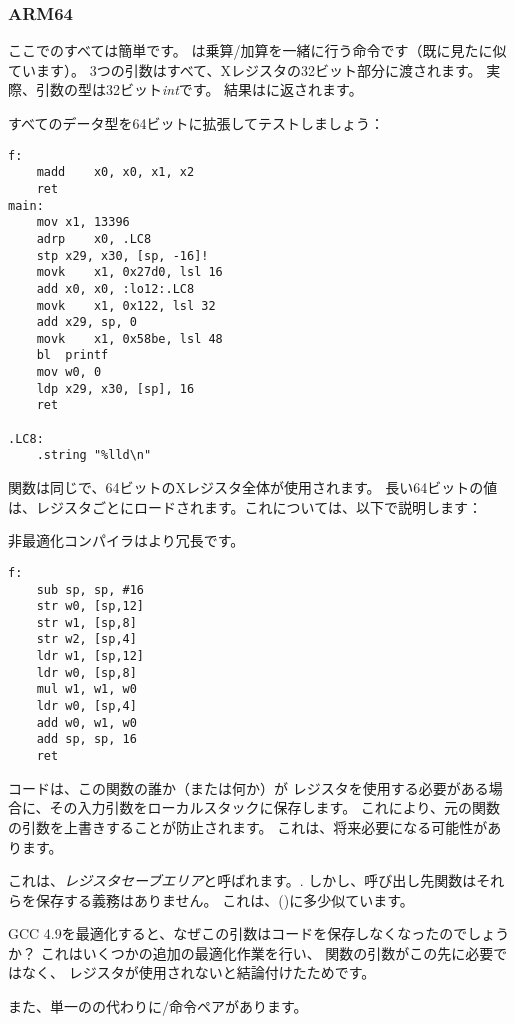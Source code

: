 \subsubsection{ARM64}


ここでのすべては簡単です。 
は乗算/加算を一緒に行う命令です（既に見たに似ています）。 
3つの引数はすべて、Xレジスタの32ビット部分に渡されます。 
実際、引数の型は32ビット\emph{int}です。 結果はに返されます。



すべてのデータ型を64ビットに拡張してテストしましょう：



\begin{lstlisting}[style=customasmARM]
f:
	madd	x0, x0, x1, x2
	ret
main:
	mov	x1, 13396
	adrp	x0, .LC8
	stp	x29, x30, [sp, -16]!
	movk	x1, 0x27d0, lsl 16
	add	x0, x0, :lo12:.LC8
	movk	x1, 0x122, lsl 32
	add	x29, sp, 0
	movk	x1, 0x58be, lsl 48
	bl	printf
	mov	w0, 0
	ldp	x29, x30, [sp], 16
	ret

.LC8:
	.string	"%lld\n"
\end{lstlisting}

\ttf 関数は同じで、64ビットのXレジスタ全体が使用されます。 
長い64ビットの値は、レジスタごとにロードされます。これについては、以下で説明します：


非最適化コンパイラはより冗長です。

\begin{lstlisting}[style=customasmARM]
f:
	sub	sp, sp, #16
	str	w0, [sp,12]
	str	w1, [sp,8]
	str	w2, [sp,4]
	ldr	w1, [sp,12]
	ldr	w0, [sp,8]
	mul	w1, w1, w0
	ldr	w0, [sp,4]
	add	w0, w1, w0
	add	sp, sp, 16
	ret
\end{lstlisting}

コードは、この関数の誰か（または何か）が
レジスタを使用する必要がある場合に、その入力引数をローカルスタックに保存します。 
これにより、元の関数の引数を上書きすることが防止されます。
これは、将来必要になる可能性があります。

これは、\emph{レジスタセーブエリア}と呼ばれます。\ARMPCS.
しかし、呼び出し先関数はそれらを保存する義務はありません。 
これは、()に多少似ています。

GCC 4.9を最適化すると、なぜこの引数はコードを保存しなくなったのでしょうか？ 
これはいくつかの追加の最適化作業を行い、
関数の引数がこの先に必要ではなく、
レジスタが使用されないと結論付けたためです。


また、単一のの代わりに/命令ペアがあります。
